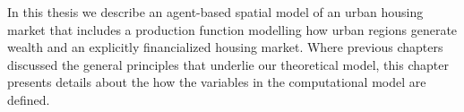 







In this thesis  we describe an agent-based spatial model of an urban housing market that includes a production function modelling how urban regions generate wealth and an explicitly financialized housing market.  Where previous chapters %
discussed the general principles that underlie our theoretical model, this chapter presents details about the how the variables in the computational model are defined. %

